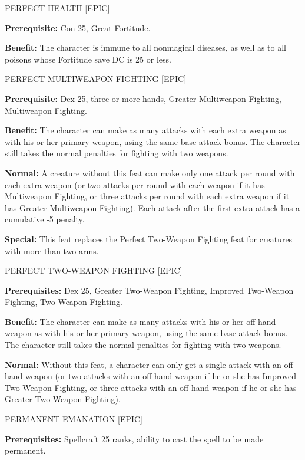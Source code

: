 \documentclass{article}
\begin{document}
\vspace{12pt}
PERFECT HEALTH [EPIC] 

\textbf{Prerequisite:} Con 25, Great Fortitude. 

\textbf{Benefit:} The character is immune to all nonmagical diseases, as well as 
to all poisons whose Fortitude save DC is 25 or less. 

\vspace{12pt}
PERFECT MULTIWEAPON FIGHTING [EPIC] 

\textbf{Prerequisite:} Dex 25, three or more hands, Greater Multiweapon Fighting, 
Multiweapon Fighting. 

\textbf{Benefit:} The character can make as many attacks with each extra weapon 
as with his or her primary weapon, using the same base attack bonus. The character 
still takes the normal penalties for fighting with two weapons. 

\textbf{Normal:} A creature without this feat can make only one attack per round 
with each extra weapon (or two attacks per round with each weapon if it has Multiweapon 
Fighting, or three attacks per round with each extra weapon if it has Greater Multiweapon 
Fighting). Each attack after the first extra attack has a cumulative -5 penalty. 

\textbf{Special:} This feat replaces the Perfect Two-Weapon Fighting feat for creatures 
with more than two arms.

\vspace{12pt}
PERFECT TWO-WEAPON FIGHTING [EPIC] 

\textbf{Prerequisites:} Dex 25, Greater Two-Weapon Fighting, Improved Two-Weapon 
Fighting, Two-Weapon Fighting. 

\textbf{Benefit:} The character can make as many attacks with his or her off-hand 
weapon as with his or her primary weapon, using the same base attack bonus. The 
character still takes the normal penalties for fighting with two weapons. 

\textbf{Normal:} Without this feat, a character can only get a single attack with 
an off-hand weapon (or two attacks with an off-hand weapon if he or she has Improved 
Two-Weapon Fighting, or three attacks with an off-hand weapon if he or she has 
Greater Two-Weapon Fighting). 

\vspace{12pt}
PERMANENT EMANATION [EPIC] 

\textbf{Prerequisites:} Spellcraft 25 ranks, ability to cast the spell to be made 
permanent. 
\end{document}

